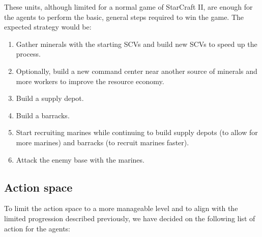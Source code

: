 These units, although limited for a normal game of StarCraft II, are enough for the agents to perform the basic, general steps required to win the game. The expected strategy would be:

\begin{enumerate}
    \item Gather minerals with the starting SCVs and build new SCVs to speed up the process.
    \item Optionally, build a new command center near another source of minerals and more workers to improve the resource economy.
    \item Build a supply depot.
    \item Build a barracks.
    \item Start recruiting marines while continuing to build supply depots (to allow for more marines) and barracks (to recruit marines faster).
    \item Attack the enemy base with the marines.
\end{enumerate}

\subsection{Action space}

To limit the action space to a more manageable level and to align with the limited progression described previously, we have decided on the following list of action for the agents:

